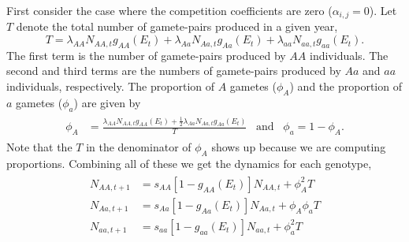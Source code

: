 \documentclass[11pt]{article}
\begin{document}
First consider the case where the competition coefficients are zero ($\alpha_{i,j}=0$).  Let $T$ denote the total number of gamete-pairs produced in a given year,
\begin{equation}
T = \lambda_{AA}N_{AA,t}g_{AA}(E_t)+ \lambda_{Aa}N_{Aa,t}g_{Aa}(E_t)+\lambda_{aa}N_{aa,t}g_{aa}(E_t).
\end{equation}
The first term is the number of gamete-pairs produced by $AA$ individuals.  The second and third terms are the numbers of gamete-pairs produced by $Aa$ and $aa$ individuals, respectively. The proportion of $A$ gametes ($\phi_A$) and the proportion of $a$ gametes ($\phi_a$) are given by
\begin{align}\begin{split}
\phi_{A} &= \frac{\lambda_{AA}N_{AA,t}g_{AA}(E_t)+ \frac{1}{2}\lambda_{Aa}N_{Aa,t}g_{Aa}(E_t)}{T} \hspace{10pt} \text{and} \hspace{10pt} \phi_a = 1-\phi_{A}.
\end{split}\end{align}
Note that the $T$ in the denominator of $\phi_A$ shows up because we are computing proportions.  Combining all of these we get the dynamics for each genotype,
\begin{align}\begin{split}
N_{AA,t+1} &= s_{AA}[1-g_{AA}(E_t)]N_{AA,t} + \phi_A^2T\\
N_{Aa,t+1} &= s_{Aa}[1-g_{Aa}(E_t)]N_{Aa,t} + \phi_A\phi_aT\\
N_{aa,t+1} &= s_{aa}[1-g_{aa}(E_t)]N_{aa,t} + \phi_a^2T
\end{split}\end{align}
\end{document}
